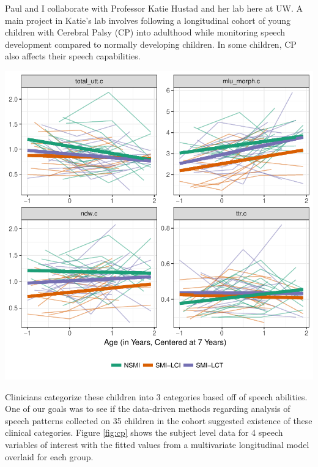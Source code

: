 \documentclass[12pt]{article}
\begin{document}
\begin{multicols}{2}
Paul and I collaborate with Professor Katie Hustad and her lab here at UW. A main project in Katie's lab involves following a longitudinal cohort of young children with Cerebral Palsy (CP) into adulthood while monitoring speech development compared to normally developing children. In some children, CP also affects their speech capabilities. 
\begin{center}\vspace{.25cm}
\includegraphics[width=1\linewidth]{fitted_plots_for_speech_analysis_speech_for_handout.pdf}
\label{fig:cp}
\end{center}\vspace{.25cm}
\hspace{.5cm}Clinicians categorize these children into 3 categories based off of speech abilities. One of our goals was to see if the data-driven methods regarding analysis of speech patterns collected on 35 children in the cohort suggested existence of these clinical categories.  Figure \ref{fig:cp} shows the subject level data for 4 speech variables of interest with the fitted values from a multivariate longitudinal model overlaid for each group.




\end{multicols}
\end{document}
